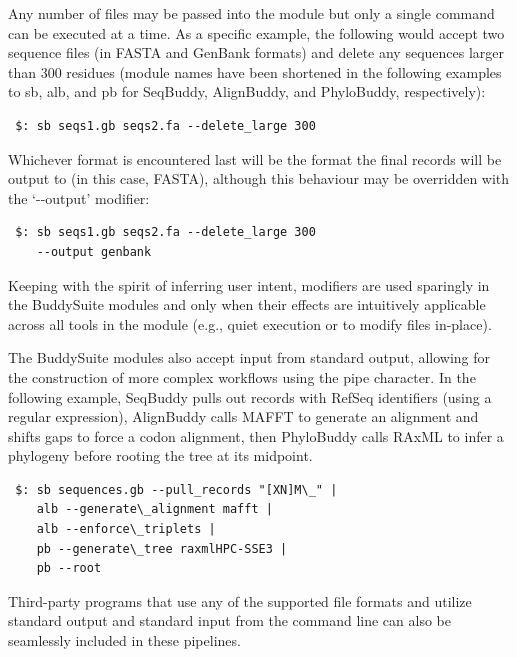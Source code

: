 \documentclass[nogrid]{MBE_article}%
\begin{document}
Any number of files may be passed into the module but only a single command can be executed at a time. As a specific example, the following would accept two sequence files (in FASTA and GenBank formats) and delete any sequences larger than 300 residues (module names have been shortened in the following examples to sb, alb, and pb for SeqBuddy, AlignBuddy, and PhyloBuddy, respectively):

\smallskip

{\small
\begin{verbatim}
 $: sb seqs1.gb seqs2.fa --delete_large 300
\end{verbatim}
}
\smallskip

Whichever format is encountered last will be the format the final records will be output to (in this case, FASTA), although this behaviour may be overridden with the `-{}-output' modifier:

\smallskip

{\small
\begin{verbatim}
 $: sb seqs1.gb seqs2.fa --delete_large 300
    --output genbank
\end{verbatim}
}
\smallskip

Keeping with the spirit of inferring user intent, modifiers are used sparingly in the BuddySuite modules and only when their effects are intuitively applicable across all tools in the module (e.g., quiet execution or to modify files in-place).

The BuddySuite modules also accept input from standard output, allowing for the construction of more complex workflows using the pipe character. In the following example, SeqBuddy pulls out records with RefSeq identifiers (using a regular expression), AlignBuddy calls MAFFT to generate an alignment and shifts gaps to force a codon alignment, then PhyloBuddy calls RAxML to infer a phylogeny before rooting the tree at its midpoint.

\smallskip
{\small
\begin{verbatim}
 $: sb sequences.gb --pull_records "[XN]M\_" |
    alb --generate\_alignment mafft |
    alb --enforce\_triplets |
    pb --generate\_tree raxmlHPC-SSE3 |
    pb --root
\end{verbatim}
}

\smallskip
Third-party programs that use any of the supported file formats and utilize standard output and standard input from the command line can also be seamlessly included in these pipelines.
\end{document}

